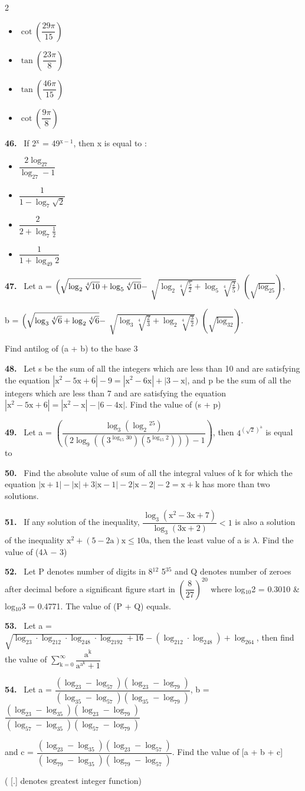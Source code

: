 \documentclass[10pt]{extarticle}
\newcommand{\qn}[1]{\par\smallskip\noindent\textbf{#1.}~}
\newenvironment{qoptions}{\begin{itemize}[leftmargin=1.8em,itemsep=1pt,topsep=2pt,label={}]}{\end{itemize}}
\newcommand{\opt}[2]{\item[(#1)] #2}
\begin{document}
\begin{multicols}{2}
\begin{qoptions}
\opt{A}{$\cot\left(\dfrac{29\pi}{15}\right)$}
\opt{B}{$\tan\left(\dfrac{23\pi}8\right)$}
\opt{C}{$\tan\left(\dfrac{46\pi}{15}\right)$}
\opt{D}{$\cot\left(\dfrac{9\pi}8\right)$}
\end{qoptions}
\qn{46} If 2$^\mathrm x$ = 49$^{\mathrm x-1}$, then x is equal to :
\begin{qoptions}
\opt{A}{$\dfrac{2\log_27}{\log_27-1}$}
\opt{B}{$\dfrac1{1-\log_7\sqrt2}$}
\opt{C}{$\dfrac2{2+\log_7\frac12}$}
\opt{D}{$\dfrac1{1+\log_{49}2}$}
\end{qoptions}
\qn{47} Let a = $\Bigl(\sqrt{\log_2\sqrt[4]{10}+\log_5\sqrt[4]{10}}-$ $\sqrt{\log_2\sqrt[4]{\tfrac52}+\log_5\sqrt[4]{\tfrac25}}\Bigr)$ $\left(\sqrt{\log_25}\right)$,\par
b = $\Bigl(\sqrt{\log_3\sqrt[4]6+\log_2\sqrt[4]6}-$ $\sqrt{\log_3\sqrt[4]{\tfrac23}+\log_2\sqrt[4]{\tfrac32}}\Bigr)$ $\left(\sqrt{\log_32}\right)$.\par
Find antilog of (a + b) to the base 3
\qn{48} Let s be the sum of all the integers which are less than 10 and are satisfying the equation $\left|\mathrm x^2-5\mathrm x+6\right|-9=\left|\mathrm x^2-6\mathrm x\right|+|3-\mathrm x|$, and p be the sum of all the integers which are less than 7 and are satisfying the equation $\left|\mathrm x^2-5\mathrm x+6\right|=\left|\mathrm x^2-\mathrm x\right|-|6-4\mathrm x|$. Find the value of (s + p)
\qn{49} Let a = $\left(\dfrac{\log_3\left(\log_2{}^25\right)}{\left(2\log_9\left(\left(3^{\log_{15}30}\right)\left(5^{\log_{15}2}\right)\right)\right)-1}\right)$, then $4^{\left(\sqrt2\right)^\mathrm a}$ is equal to
\qn{50} Find the absolute value of sum of all the integral values of k for which the equation $|\mathrm x+1|-|\mathrm x|+3|\mathrm x-1|-2|\mathrm x-2|-2=\mathrm x+\mathrm k$ has more than two solutions.
\qn{51} If any solution of the inequality, $\dfrac{\log_3\left(\mathrm x^2-3\mathrm x+7\right)}{\log_3(3\mathrm x+2)}<1$ is also a solution of the inequality $\mathrm x^2+(5-2\mathrm a)\mathrm x\leq10\mathrm a$, then the least value of a is $\lambda$. Find the value of (4$\lambda$ $-$ 3)
\qn{52} Let P denotes number of digits in 8$^{12}$ 5$^{35}$ and Q denotes number of zeroes after decimal before a significant figure start in $\left(\dfrac8{27}\right)^{20}$ where log$_{10}$2 = 0.3010 \& log$_{10}$3 = 0.4771. The value of (P + Q) equals.
\qn{53} Let a = $\sqrt{\log_23\cdot\log_212\cdot\log_248\cdot\log_2192+16}-\left(\log_212\cdot\log_248\right)+\log_264$, then find the value of $\displaystyle\sum_{\mathrm k=0}^{\infty}\dfrac{\mathrm a^\mathrm k}{\mathrm a^{\mathrm a^\mathrm k}+1}$
\qn{54} Let a = $\dfrac{\left(\log_23-\log_57\right)\left(\log_23-\log_79\right)}{\left(\log_35-\log_57\right)\left(\log_35-\log_79\right)}$, b = $\dfrac{\left(\log_23-\log_35\right)\left(\log_23-\log_79\right)}{\left(\log_57-\log_35\right)\left(\log_57-\log_79\right)}$\par
and c = $\dfrac{\left(\log_23-\log_35\right)\left(\log_23-\log_57\right)}{\left(\log_79-\log_35\right)\left(\log_79-\log_57\right)}$. Find the value of [a + b + c]\par
( [.] denotes greatest integer function)
\end{multicols}
\end{document}
